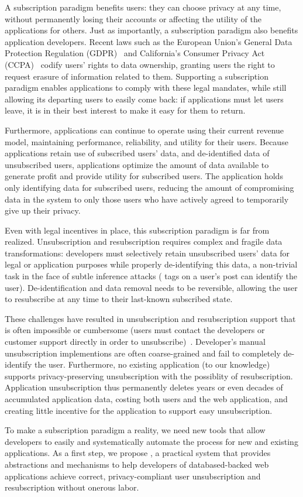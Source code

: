 A subscription paradigm benefits users: they can choose privacy at any time, without
permanently losing their accounts or affecting the utility of the applications for others.  Just as
importantly, a subscription paradigm  also benefits application developers. Recent laws such as the
European Union's General Data Protection Regulation (GDPR)~\cite{eu:gdpr} and California's Consumer
Privacy Act (CCPA)~\cite{ca:privacy-act} codify users' rights to data ownership, granting users the
right to request erasure of information related to them. Supporting a subscription paradigm enables
applications to comply with these legal mandates, while still allowing its departing users to easily
come back: if applications must let users leave, it is in their best interest to make it easy for
them to return.  

Furthermore, applications can continue to operate using their current revenue model, maintaining
performance, reliability, and utility for their users.  Because applications retain use of
subscribed users' data, and de-identified data of unsubscribed users, applications optimize the
amount of data available to generate profit and provide utility for subscribed users. The
application holds only identifying data for subscribed users, reducing the amount of
compromising data in the system to only those users who have actively agreed to temporarily give up
their privacy.

Even with legal incentives in place, this subscription paradigm is far from realized.
Unsubscription and resubscription requires complex and fragile data transformations: 
developers must selectively retain unsubscribed users' data for legal or application purposes while
properly de-identifying this data, a non-trivial task in the face of subtle inference attacks (\eg
tags on a user's post can identify the user). De-identification and data removal needs to be
reversible, allowing the user to resubscribe at any time to their last-known subscribed state.

These challenges have resulted in unsubscription and resubscription support that is often impossible
or cumbersome (users must contact the developers or customer support directly in order to
unsubscribe)~\cite{jdm}.  Developer's manual unsubscription implementions are often coarse-grained
and fail to completely de-identify the user. Furthermore, no existing application (to our knowledge)
supports privacy-preserving unsubscription with the possiblity of resubscription. Application
unsubscription thus permanently deletes years or even decades of accumulated application data,
costing both users and the web application, and creating little incentive for the application to
support easy unsubscription. 

To make a subscription paradigm a reality, we need new tools that allow developers to easily and
systematically automate the process for new and existing applications. As a first step, we propose
\sys, a practical system that provides abstractions and mechanisms to help developers of databased-backed web
applications achieve correct, privacy-compliant user unsubscription and resubscription without
onerous labor.

